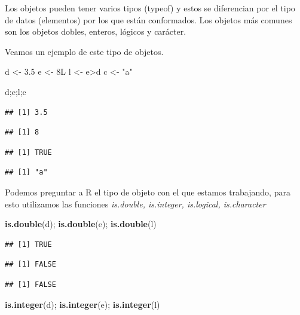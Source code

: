 \documentclass[]{article}
\newenvironment{Shaded}{\begin{snugshade}}{\end{snugshade}}
\newcommand{\KeywordTok}[1]{\textcolor[rgb]{0.13,0.29,0.53}{\textbf{{#1}}}}
\newcommand{\FloatTok}[1]{\textcolor[rgb]{0.00,0.00,0.81}{{#1}}}
\newcommand{\StringTok}[1]{\textcolor[rgb]{0.31,0.60,0.02}{{#1}}}
\newcommand{\NormalTok}[1]{{#1}}
\begin{document}
Los objetos pueden tener varios tipos (typeof) y estos se diferencian
por el tipo de datos (elementos) por los que están conformados. Los
objetos más comunes son los objetos dobles, enteros, lógicos y carácter.

Veamos un ejemplo de este tipo de objetos.

\begin{Shaded}
\begin{Highlighting}[]
\NormalTok{d <-}\StringTok{ }\FloatTok{3.5}
\NormalTok{e <-}\StringTok{ }\NormalTok{8L}
\NormalTok{l <-}\StringTok{ }\NormalTok{e>d}
\NormalTok{c <-}\StringTok{ "a"}

\NormalTok{d;e;l;c}
\end{Highlighting}
\end{Shaded}

\begin{verbatim}
## [1] 3.5
\end{verbatim}

\begin{verbatim}
## [1] 8
\end{verbatim}

\begin{verbatim}
## [1] TRUE
\end{verbatim}

\begin{verbatim}
## [1] "a"
\end{verbatim}

Podemos preguntar a R el tipo de objeto con el que estamos trabajando,
para esto utilizamos las funciones \emph{is.double, is.integer,
is.logical, is.character}

\begin{Shaded}
\begin{Highlighting}[]
\KeywordTok{is.double}\NormalTok{(d); }\KeywordTok{is.double}\NormalTok{(e); }\KeywordTok{is.double}\NormalTok{(l)}
\end{Highlighting}
\end{Shaded}

\begin{verbatim}
## [1] TRUE
\end{verbatim}

\begin{verbatim}
## [1] FALSE
\end{verbatim}

\begin{verbatim}
## [1] FALSE
\end{verbatim}

\begin{Shaded}
\begin{Highlighting}[]
\KeywordTok{is.integer}\NormalTok{(d); }\KeywordTok{is.integer}\NormalTok{(e); }\KeywordTok{is.integer}\NormalTok{(l)}
\end{Highlighting}
\end{Shaded}
\end{document}

